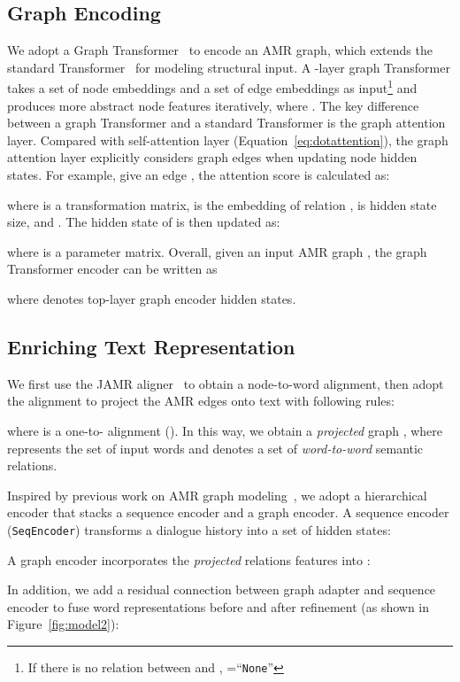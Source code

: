 \documentclass[11pt,a4paper]{article}
\begin{document}
\subsection{Graph Encoding}
\label{sec:graphTransformer}
We adopt a Graph Transformer~\cite{zhu2019modeling} to encode an AMR graph,
which extends the standard Transformer~\cite{vaswani2017attention} for modeling structural input. 
A -layer graph Transformer takes a set of node embeddings  and a set of edge embeddings  as input\footnote{If there is no relation between  and , =``\texttt{None}''} and produces more abstract node features  iteratively, where . 
The key difference between a graph Transformer and a standard Transformer is the graph attention layer. 
Compared with self-attention layer (Equation~\ref{eq:dotattention}), the graph attention layer explicitly considers graph edges when updating node hidden states.
For example, give an edge , the attention score  is calculated as:

where  is a transformation matrix,  is the embedding of relation ,  is hidden state size, and .
The hidden state of  is then updated as:

where  is a parameter matrix.
Overall, given an input AMR graph , the graph Transformer encoder can be written as

where  denotes top-layer graph encoder hidden states.


\subsection{Enriching Text Representation}
\label{sec:refine}
We first use the JAMR aligner~\cite{flanigan-etal-2014-discriminative} to obtain a node-to-word alignment, then adopt the alignment to project the AMR edges onto text with following rules:

where  is a one-to- alignment (). 
In this way, we obtain a \textit{projected} graph , where  represents the set of input words  and  denotes a set of \textit{word-to-word} semantic relations.

Inspired by previous work on AMR graph modeling~\cite{guo-etal-2019-attention,song-etal-2019-leveraging,sun-etal-2019-aspect}, we adopt a hierarchical encoder that stacks a sequence encoder and a graph encoder. 
A sequence encoder (\texttt{SeqEncoder}) transforms a dialogue history into a set of hidden states:


A graph encoder incorporates the \textit{projected} relations features into :


In addition, we add a residual connection between graph adapter and sequence encoder to fuse word representations before and after refinement (as shown in Figure~\ref{fig:model2}):
\end{document}
